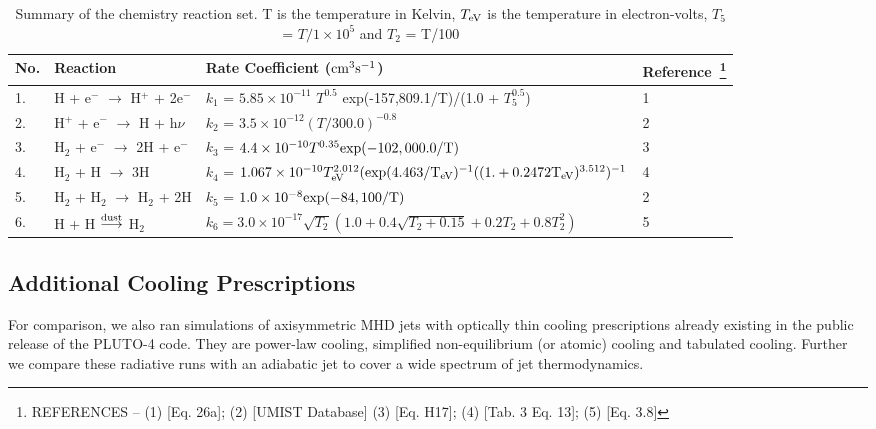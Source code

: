 \documentclass[useAMS,usenatbib]{mn2e}
\begin{document}
\begin{table*}
\begin{minipage}{\textwidth}
\caption{Summary of the chemistry reaction set. T is the temperature
  in Kelvin, $T_{\rm eV}$ is the temperature in electron-volts, $T_{5}$
  = $T/1\times10^{5}$  and 
$T_{2}$  = T/100}
\label{tab:chemeq}
\begin{tabular}{l l l l}
\hline
No. & Reaction & Rate Coefficient ($\rm {cm}^{3} s^{-1}$) &
Reference~\footnote{REFERENCES -- (1) \cite{Cen:1992p13616} [Eq. 26a];
  (2) \cite{Woodall:2007p13623} [UMIST Database] (3)
  \cite{Galli:1998p13066} [Eq. H17]; (4) \cite{Abel:1997p12836}
  [Tab. 3 Eq. 13]; (5) \cite{Hollenbach:1979p12707} [Eq. 3.8]}\\
\hline
1. & H + e$^{-}$ $\rightarrow$ H$^{+}$ + 2e$^{-}$ & $k_1$ = $5.85
\times 10^{-11}$ $T^{0.5}$ \rm{exp}(-157,809.1/T)/(1.0 + $T_{5}^{0.5}$) & 1\\
2. & H$^{+}$ + e$^{-}$ $\rightarrow$ H + h$\nu$ & $k_2$ =
$3.5\times10^{-12} (T/300.0)^{-0.8}$ & 2\\
3. & H$_{2}$ + e$^{-}$ $\rightarrow$ 2H + e$^{-}$ & $k_3$ =
$4.4\times10^{-10} T^{0.35} \rm{exp}(-102,000.0/T)$ & 3\\
4. & H$_{2}$ + H $\rightarrow$ 3H & $k_4$ = $1.067\times10^{-10}
T_{\rm eV}^{2.012}(\rm{exp}(4.463/T_{\rm eV})^{-1}((1. + 0.2472 T_{\rm eV})^{3.512})^{-1} $& 4\\
5. &H$_{2}$ + H$_{2}$ $\rightarrow$ H$_{2}$ + 2H & $k_5$ = $1.0\times 10^{-8} \rm{exp}(-84,100/T)$ & 2\\
6. & H + H $\overset{\rm dust}\longrightarrow$ H$_{2}$ & $k_6 =
3.0\times10^{-17}\sqrt{T_{2}}(1.0 + 0.4\sqrt{T_{2} + 0.15} + 0.2T_{2} + 0.8T_{2}^{2})$ & 5 \\
\hline
\end{tabular}
\end{minipage}
\end{table*}

\subsection{Additional Cooling Prescriptions}
For comparison, we also ran simulations of axisymmetric MHD jets
with optically thin cooling prescriptions already existing in the public
release of the PLUTO-4 code. They are power-law cooling, 
simplified non-equilibrium (or atomic) cooling and tabulated
cooling. Further we compare these radiative runs with an adiabatic jet 
to cover a wide spectrum of jet thermodynamics. 
%
\end{document}
